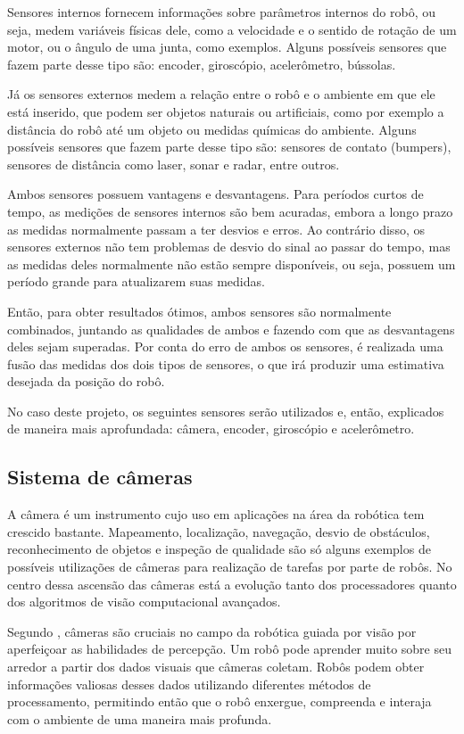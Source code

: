 \documentclass[acronym, symbols, table]{fei}
\begin{document}
			Sensores internos fornecem informações sobre parâmetros internos do robô, ou seja, medem variáveis físicas dele, como a velocidade e o sentido de rotação de um motor, ou o ângulo de uma junta, como exemplos. Alguns possíveis sensores que fazem parte desse tipo são: encoder, giroscópio, acelerômetro, bússolas.
			
			Já os sensores externos medem a relação entre o robô e o ambiente em que ele está inserido, que podem ser objetos naturais ou artificiais, como por exemplo a distância do robô até um objeto ou medidas químicas do ambiente. Alguns possíveis sensores que fazem parte desse tipo são: sensores de contato (bumpers), sensores de distância como laser, sonar e radar, entre outros.
			
			Ambos sensores possuem vantagens e desvantagens. Para períodos curtos de tempo, as medições de sensores internos são bem acuradas, embora a longo prazo as medidas normalmente passam a ter desvios e erros. Ao contrário disso, os sensores externos não tem problemas de desvio do sinal ao passar do tempo, mas as medidas deles normalmente não estão sempre disponíveis, ou seja, possuem um período grande para atualizarem suas medidas.
			
			Então, para obter resultados ótimos, ambos sensores são normalmente combinados, juntando as qualidades de ambos e fazendo com que as desvantagens deles sejam superadas. Por conta do erro de ambos os sensores, é realizada uma fusão das medidas dos dois tipos de sensores, o que irá produzir uma estimativa desejada da posição do robô.
			
			No caso deste projeto, os seguintes sensores serão utilizados e, então, explicados de maneira mais aprofundada: câmera, encoder, giroscópio e acelerômetro.
			
			\subsection{Sistema de câmeras} \label{sec:sensores_cameras}
			
				A câmera é um instrumento cujo uso em aplicações na área da robótica tem crescido bastante. Mapeamento, localização, navegação, desvio de obstáculos, reconhecimento de objetos e inspeção de qualidade são só alguns exemplos de possíveis utilizações de câmeras para realização de tarefas por parte de robôs. No centro dessa ascensão das câmeras está a evolução tanto dos processadores quanto dos algoritmos de visão computacional avançados.
				
				Segundo \textcite{cameras_technexion}, câmeras são cruciais no campo da robótica guiada por visão por aperfeiçoar as habilidades de percepção. Um robô pode aprender muito sobre seu arredor a partir dos dados visuais que câmeras coletam. Robôs podem obter informações valiosas desses dados utilizando diferentes métodos de processamento, permitindo então que o robô enxergue, compreenda e interaja com o ambiente de uma maneira mais profunda.
				
\end{document}
